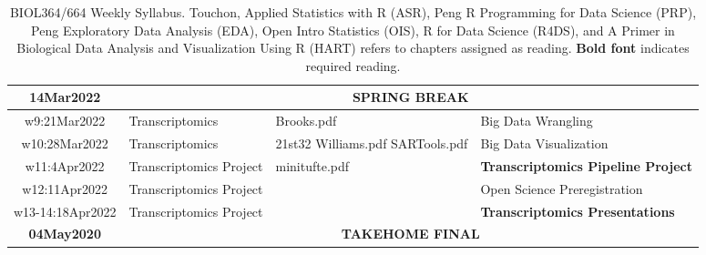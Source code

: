 \documentclass[11pt]{article} %
\begin{document}
\begin{table}[ht]
\begin{tabular}{| c | m{5cm} | m{3cm} | m{5.5cm} |}
	\hline 
	14Mar2022 & \multicolumn{3}{c}{\bf SPRING BREAK}\\ 
	\hline
	w9:21Mar2022 & Transcriptomics & Brooks.pdf & Big Data Wrangling \\
	\hline
	w10:28Mar2022 & Transcriptomics & 21st32 \newline Williams.pdf  \newline SARTools.pdf  & Big Data Visualization  \\
	\hline
	w11:4Apr2022 & Transcriptomics Project & minitufte.pdf & {\bf Transcriptomics Pipeline Project} \\
	\hline
	w12:11Apr2022 & Transcriptomics Project &  & Open Science \newline Preregistration \\
	\hline 
	w13-14:18Apr2022 & Transcriptomics Project & & {\bf Transcriptomics Presentations}  \\ 
	\hline
	\hline
	\hline
	{\bf 04May2020}	  & \multicolumn{3}{c}{\bf TAKEHOME FINAL} \\
	\hline
	\hline
\end{tabular}
 
\caption{BIOL364/664 Weekly Syllabus. Touchon, Applied Statistics with R (ASR), Peng R Programming for Data Science (PRP), Peng Exploratory Data Analysis (EDA), Open Intro Statistics (OIS), R for Data Science (R4DS),  and A Primer in Biological Data Analysis and Visualization Using R (HART) refers to chapters assigned as reading. {\bf Bold font} indicates required reading. }
\label{table:Syllabus} %
\end{table} 


\end{document}
